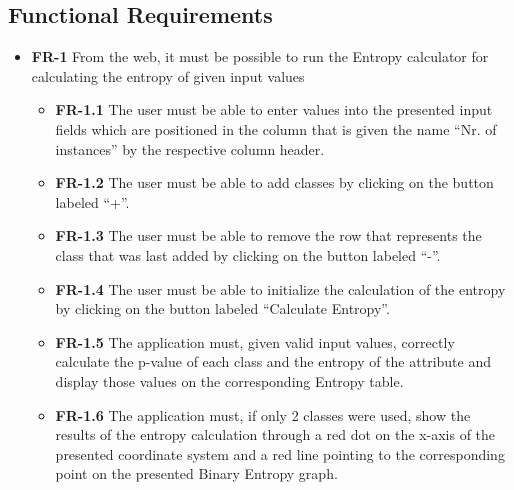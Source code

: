 \subsection{Functional Requirements}
\begin{itemize}
    \item \textbf{FR-1} From the web, it must be possible to run the Entropy calculator for calculating the entropy of given input values
    \begin{itemize}
        \item \textbf{FR-1.1} The user must be able to enter values into the presented input fields which are positioned in the column that is given the name ``Nr. of instances'' by the respective column header.
        \item \textbf{FR-1.2} The user must be able to add classes by clicking on the button labeled ``+''.
        \item \textbf{FR-1.3} The user must be able to remove the row that represents the class that was last added by clicking on the button labeled ``-''.
        \item \textbf{FR-1.4} The user must be able to initialize the calculation of the entropy by clicking on the button labeled ``Calculate Entropy''.
        \item \textbf{FR-1.5} The application must, given valid input values, correctly calculate the p-value of each class and the entropy of the attribute and display those values on the corresponding Entropy table.
        \item \textbf{FR-1.6} The application must, if only 2 classes were used, show the results of the entropy calculation through a red dot on the x-axis of the presented coordinate system and a red line pointing to the corresponding point on the presented Binary Entropy graph.
    \end{itemize}
\end{itemize}

